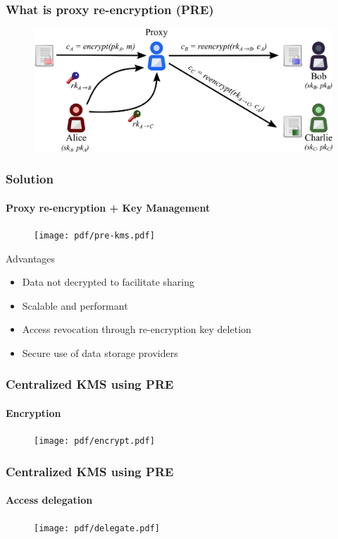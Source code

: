 \documentclass[xetex,mathsans,sans,aspectratio=169]{beamer}
\begin{document}
    \begin{frame}
        \frametitle{What is proxy re-encryption (PRE)}
        \begin{figure}
            \centering
            \includegraphics[width=13cm]{pdf/pre-multi.pdf}
        \end{figure}
    \end{frame}

    \begin{frame}
        \frametitle{Solution}
        \framesubtitle{Proxy re-encryption + Key Management}
        \begin{figure}
            \centering
            \texttt{[image: pdf/pre-kms.pdf]}
        \end{figure}

        Advantages
        \begin{itemize}
            \item Data not decrypted to facilitate sharing
            \item Scalable and performant
            \item Access revocation through re-encryption key deletion
            \item Secure use of data storage providers
        \end{itemize}
    \end{frame}

    \begin{frame}
        \frametitle{Centralized KMS using PRE}
        \framesubtitle{Encryption}
        \begin{figure}
            \centering
            \texttt{[image: pdf/encrypt.pdf]}
        \end{figure}
    \end{frame}

    \begin{frame}
        \frametitle{Centralized KMS using PRE}
        \framesubtitle{Access delegation}
        \begin{figure}
            \centering
            \texttt{[image: pdf/delegate.pdf]}
        \end{figure}
    \end{frame}
\end{document}
